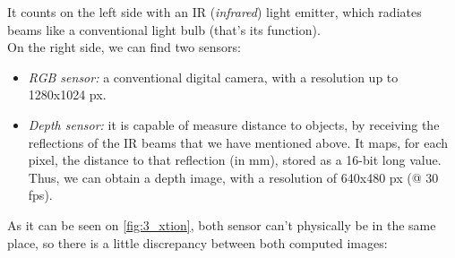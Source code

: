 		It counts on the left side with an IR (\emph{infrared}) light emitter, which radiates beams like a conventional light bulb (that's its function).\\

		On the right side, we can find two sensors:
		\begin{itemize}
			\item \emph{RGB sensor:} a conventional digital camera, with a resolution up to 1280x1024 px.
			
			\item \emph{Depth sensor:} it is capable of measure distance to objects, by receiving the reflections of the IR beams that we have mentioned above. It maps, for each pixel, the distance to that reflection (in mm), stored as a 16-bit long value.\\
			
			Thus, we can obtain a depth image, with a resolution of 640x480 px (@ 30 fps).
		\end{itemize}
		
		As it can be seen on \autoref{fig:3_xtion}, both sensor can't physically be in the same place, so there is a little discrepancy between both computed images:


